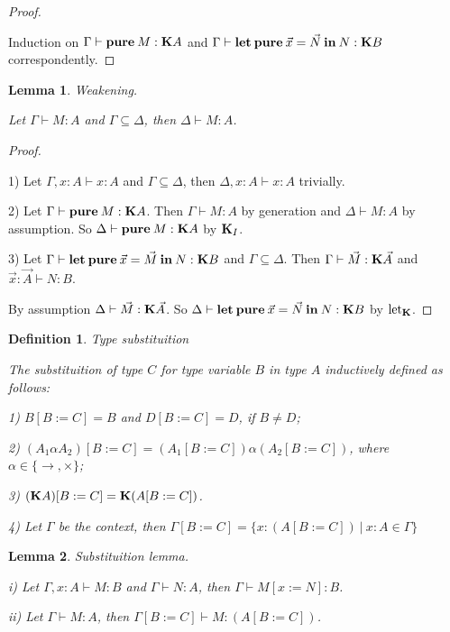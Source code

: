 \documentclass[a4paper]{article}
\newtheorem{lemma}{Lemma}
\newtheorem{defin}{Definition}
\begin{document}
\begin{proof}
  $ $

  Induction on $\Gamma \vdash {\bf pure \:} M : {\bf K}A$ and $\Gamma \vdash {\bf let \: pure \:} \vec{x} = \vec{N} {\: \bf in \:} N : {\bf K}B$ correspondently.
\end{proof}

\begin{lemma} Weakening.

  Let $\Gamma \vdash M : A$ and $\Gamma \subseteq \Delta$, then $\Delta \vdash M : A$.

\end{lemma}

\begin{proof}
  $ $

  1) Let $\Gamma, x : A \vdash x : A$ and $\Gamma \subseteq \Delta$, then $\Delta, x : A \vdash x : A$ trivially.

  2) Let $\Gamma \vdash {\bf pure \:} M : {\bf K}A$. Then $\Gamma \vdash M : A$ by generation and $\Delta \vdash M : A$ by assumption. So $\Delta \vdash {\bf pure \:} M : {\bf K} A$ by ${\bf K}_I$.

  3) Let $\Gamma \vdash {\bf let \: pure \:} \vec{x} = \vec{M} {\: \bf in \:} N : {\bf K}B$ and $\Gamma \subseteq \Delta$. Then $\Gamma \vdash \vec{M} : {\bf K}\vec{A}$ and $\vec{x} : \vec{A} \vdash N : B$.

  By assumption $\Delta \vdash \vec{M} : {\bf K}\vec{A}$. So $\Delta \vdash {\bf let \: pure \:} \vec{x} = \vec{N} {\: \bf in \:} N : {\bf K}B$ by $\text{let}_{{\bf K}}$.
\end{proof}

\begin{defin} Type substituition

  The substituition of type $C$ for type variable $B$ in type $A$ inductively defined as follows:

  1) $B [B := C] = B$ and $D [B := C] = D$, if $B \neq D$;

  2) $(A_1 \alpha A_2)[B := C] = (A_1[B := C]) \alpha (A_2[B := C])$, where $\alpha \in \{ \to, \times \}$;

  3) $({\bf K}A)[B := C] = {\bf K}(A [B := C])$.

  4) Let $\Gamma$ be the context, then $\Gamma [B := C] = \{ x : (A[B := C]) \: | \: x : A \in \Gamma \}$
\end{defin}

\begin{lemma} Substituition lemma.

    i) Let $\Gamma, x : A \vdash M : B$ and $\Gamma \vdash N : A$, then $\Gamma \vdash M [x := N] : B$.

    ii) Let $\Gamma \vdash M : A$, then $\Gamma [B := C] \vdash M : (A [B := C])$.

\end{lemma}
\end{document}

